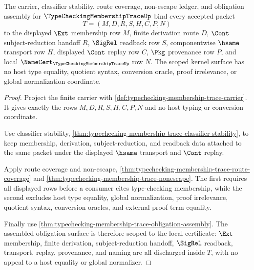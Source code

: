 \begin{theorem}
\label{thm:typechecking-membership-trace-scoped-kernel-surface}
The carrier, classifier stability, route coverage, non-escape ledger, and obligation assembly for $\TypeCheckingMembershipTraceUp$ bind every accepted packet
$$
T=(M,D,R,S,H,C,P,N)
$$
to the displayed $\Ext$ membership row $M$, finite derivation route $D$, $\Cont$ subject-reduction handoff $R$, $\SigRel$ readback row $S$, componentwise $\hsame$ transport row $H$, displayed $\Cont$ replay row $C$, $\Pkg$ provenance row $P$, and local $\NameCert_{\TypeCheckingMembershipTraceUp}$ row $N$. The scoped kernel surface has no host type equality, quotient syntax, conversion oracle, proof irrelevance, or global normalization coordinate.
\end{theorem}
\begin{proof}
Project the finite carrier with \autoref{def:typechecking-membership-trace-carrier}. It gives exactly the rows $M,D,R,S,H,C,P,N$ and no host typing or conversion coordinate.

Use classifier stability, \autoref{thm:typechecking-membership-trace-classifier-stability}, to keep membership, derivation, subject-reduction, and readback data attached to the same packet under the displayed $\hsame$ transport and $\Cont$ replay.

Apply route coverage and non-escape, \autoref{thm:typechecking-membership-trace-route-coverage} and \autoref{thm:typechecking-membership-trace-nonescape}. The first requires all displayed rows before a consumer cites type-checking membership, while the second excludes host type equality, global normalization, proof irrelevance, quotient syntax, conversion oracles, and external proof-term equality.

Finally use \autoref{thm:typechecking-membership-trace-obligation-assembly}. The assembled obligation surface is therefore scoped to the local certificate: $\Ext$ membership, finite derivation, subject-reduction handoff, $\SigRel$ readback, transport, replay, provenance, and naming are all discharged inside $T$, with no appeal to a host equality or global normalizer.
\end{proof}

